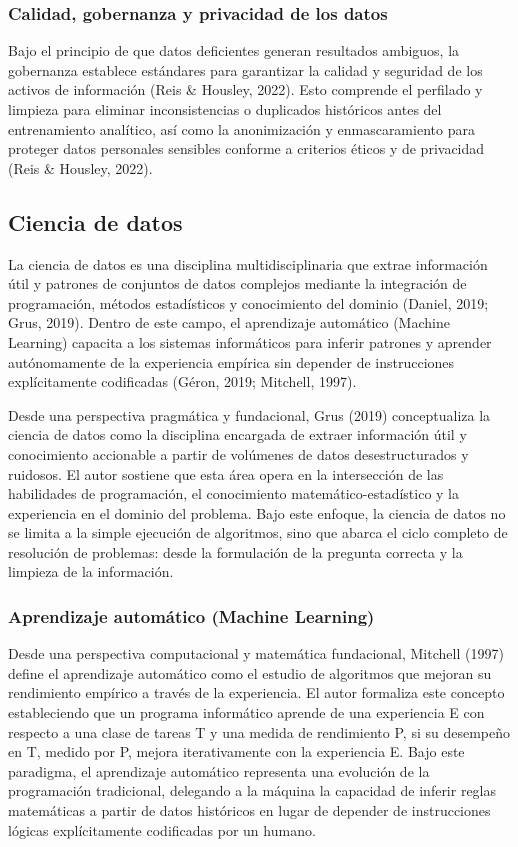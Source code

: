 \documentclass[11pt,oneside,openany]{book}
\begin{document}
\subsubsection*{Calidad, gobernanza y privacidad de los datos}

Bajo el principio de que datos deficientes generan resultados ambiguos, la gobernanza establece estándares para garantizar la calidad y seguridad de los activos de información (Reis \& Housley, 2022). Esto comprende el perfilado y limpieza para eliminar inconsistencias o duplicados históricos antes del entrenamiento analítico, así como la anonimización y enmascaramiento para proteger datos personales sensibles conforme a criterios éticos y de privacidad (Reis \& Housley, 2022).

\subsection{Ciencia de datos}

La ciencia de datos es una disciplina multidisciplinaria que extrae información útil y patrones de conjuntos de datos complejos mediante la integración de programación, métodos estadísticos y conocimiento del dominio (Daniel, 2019; Grus, 2019). Dentro de este campo, el aprendizaje automático (Machine Learning) capacita a los sistemas informáticos para inferir patrones y aprender autónomamente de la experiencia empírica sin depender de instrucciones explícitamente codificadas (Géron, 2019; Mitchell, 1997).

Desde una perspectiva pragmática y fundacional, Grus (2019) conceptualiza la ciencia de datos como la disciplina encargada de extraer información útil y conocimiento accionable a partir de volúmenes de datos desestructurados y ruidosos. El autor sostiene que esta área opera en la intersección de las habilidades de programación, el conocimiento matemático-estadístico y la experiencia en el dominio del problema. Bajo este enfoque, la ciencia de datos no se limita a la simple ejecución de algoritmos, sino que abarca el ciclo completo de resolución de problemas: desde la formulación de la pregunta correcta y la limpieza de la información.

\subsubsection*{Aprendizaje automático (Machine Learning)}

Desde una perspectiva computacional y matemática fundacional, Mitchell (1997) define el aprendizaje automático como el estudio de algoritmos que mejoran su rendimiento empírico a través de la experiencia. El autor formaliza este concepto estableciendo que un programa informático aprende de una experiencia E con respecto a una clase de tareas T y una medida de rendimiento P, si su desempeño en T, medido por P, mejora iterativamente con la experiencia E. Bajo este paradigma, el aprendizaje automático representa una evolución de la programación tradicional, delegando a la máquina la capacidad de inferir reglas matemáticas a partir de datos históricos en lugar de depender de instrucciones lógicas explícitamente codificadas por un humano.
\end{document}
